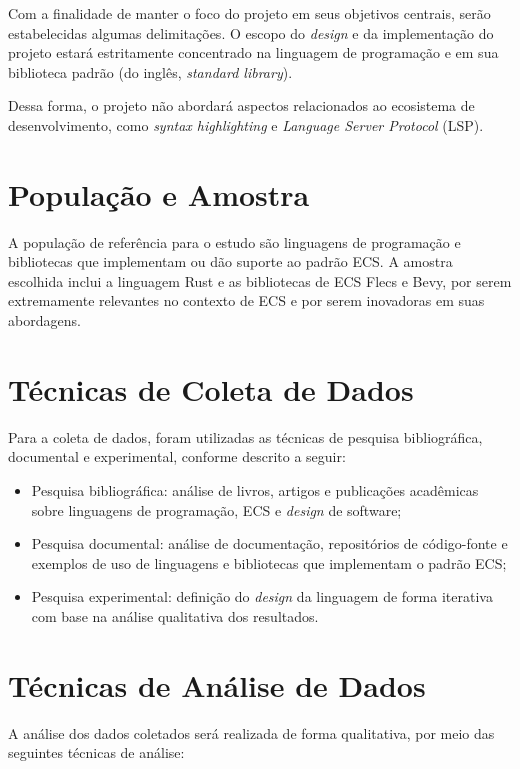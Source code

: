 Com a finalidade de manter o foco do projeto em seus objetivos centrais, serão estabelecidas algumas delimitações. O escopo do \textit{design} e da implementação do projeto estará estritamente concentrado na linguagem de programação e em sua biblioteca padrão (do inglês, \textit{standard library}).

Dessa forma, o projeto não abordará aspectos relacionados ao ecosistema de desenvolvimento, como \textit{syntax highlighting} e \textit{Language Server Protocol} (LSP).

\section{População e Amostra}

A população de referência para o estudo são linguagens de programação e bibliotecas que implementam ou dão suporte ao padrão ECS. A amostra escolhida inclui a linguagem Rust e as bibliotecas de ECS Flecs e Bevy, por serem extremamente relevantes no contexto de ECS e por serem inovadoras em suas abordagens.

\section{Técnicas de Coleta de Dados}

Para a coleta de dados, foram utilizadas as técnicas de pesquisa bibliográfica, documental e experimental, conforme descrito a seguir:

\begin{itemize}
    \item Pesquisa bibliográfica: análise de livros, artigos e publicações acadêmicas sobre linguagens de programação, ECS e \textit{design} de software;
    \item Pesquisa documental: análise de documentação, repositórios de código-fonte e exemplos de uso de linguagens e bibliotecas que implementam o padrão ECS;
    \item Pesquisa experimental: definição do \textit{design} da linguagem de forma iterativa com base na análise qualitativa dos resultados.
\end{itemize}

\section{Técnicas de Análise de Dados}

A análise dos dados coletados será realizada de forma qualitativa, por meio das seguintes técnicas de análise:

